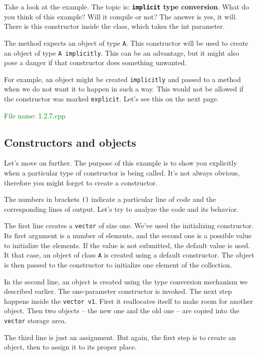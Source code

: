 Take a look at the example. The topic is: \textbf{\texttt{implicit} type conversion}.
What do you think of this example? Will it compile or not? The answer is yes, it will.
There is this constructor inside the class, which takes the int parameter. 

The  method expects an object of type \texttt{A}. This constructor will 
be used to create an object of type \texttt{A implicitly}. This can be an advantage, but it might also 
pose a danger if that constructor does something unwanted.

For example, an object might be created \texttt{implicitly} and passed to a method when we do not want 
it to happen in such a way. This would not be allowed if the constructor was marked \texttt{explicit}. 
Let’s see this on the next page.

\textcolor{green}{File name: 1.2.7.cpp}


\subsection{Constructors and objects} %
Let’s move on further. The purpose of this example is to show you explicitly when a particular 
type of constructor is being called. It’s not always obvious, therefore you might forget to 
create a constructor.

The numbers in brackets \texttt{()} indicate a particular line of code and the corresponding 
lines of output. Let’s try to analyze the code and its behavior.

The first line creates a \texttt{vector} of size one. We’ve used the initializing constructor. 
Its first argument is a number of elements, and the second one is a possible value to initialize 
the elements. If the value is not submitted, the default value is used. It that case, an object 
of class \texttt{A} is created using a default constructor. The object is then passed to the 
constructor to initialize one element of the collection.

In the second line, an object is created using the type conversion mechanism we described earlier. 
The one-parameter constructor is invoked. The next step happens inside the \texttt{vector v1}. 
First it reallocates itself to make room for another object. Then two objects – the new one and 
the old one – are copied into the \texttt{vector} storage area.

The third line is just an assignment. But again, the first step is to create an object, then 
to assign it to its proper place.

